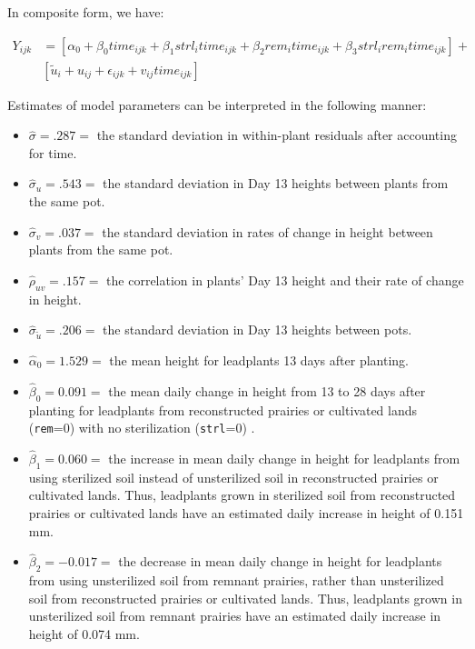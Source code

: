 \documentclass[
]{krantz}
\providecommand{\tightlist}{%
  \setlength{\itemsep}{0pt}\setlength{\parskip}{0pt}}
\begin{document}
In composite form, we have:

\begin{align*}
Y_{ijk} & = [\alpha_{0}+ \beta_{0}\textstyle{time}_{ijk} + \beta_{1}\textstyle{strl}_{i}\textstyle{time}_{ijk} + \beta_{2}\textstyle{rem}_{i}\textstyle{time}_{ijk} + \beta_{3}\textstyle{strl}_{i}\textstyle{rem}_{i}\textstyle{time}_{ijk}] + \\
 & [\tilde{u}_{i}+u_{ij}+\epsilon_{ijk}+v_{ij}\textstyle{time}_{ijk}]
\end{align*}

Estimates of model parameters can be interpreted in the following manner:

\begin{itemize}
\tightlist
\item
  \(\hat{\sigma}=.287=\) the standard deviation in within-plant residuals after accounting for time.
\item
  \(\hat{\sigma}_{u}=.543=\) the standard deviation in Day 13 heights between plants from the same pot.
\item
  \(\hat{\sigma}_{v}=.037=\) the standard deviation in rates of change in height between plants from the same pot.
\item
  \(\hat{\rho}_{uv}=.157=\) the correlation in plants' Day 13 height and their rate of change in height.
\item
  \(\hat{\sigma}_{\tilde{u}}=.206=\) the standard deviation in Day 13 heights between pots.
\item
  \(\hat{\alpha}_{0}=1.529=\) the mean height for leadplants 13 days after planting.
\item
  \(\hat{\beta}_{0}=0.091=\) the mean daily change in height from 13 to 28 days after planting for leadplants from reconstructed prairies or cultivated lands (\texttt{rem}=0) with no sterilization (\texttt{strl}=0) .
\item
  \(\hat{\beta}_{1}=0.060=\) the increase in mean daily change in height for leadplants from using sterilized soil instead of unsterilized soil in reconstructed prairies or cultivated lands. Thus, leadplants grown in sterilized soil from reconstructed prairies or cultivated lands have an estimated daily increase in height of 0.151 mm.
\item
  \(\hat{\beta}_{2}=-0.017=\) the decrease in mean daily change in height for leadplants from using unsterilized soil from remnant prairies, rather than unsterilized soil from reconstructed prairies or cultivated lands. Thus, leadplants grown in unsterilized soil from remnant prairies have an estimated daily increase in height of 0.074 mm.

\end{itemize}
\end{document}
